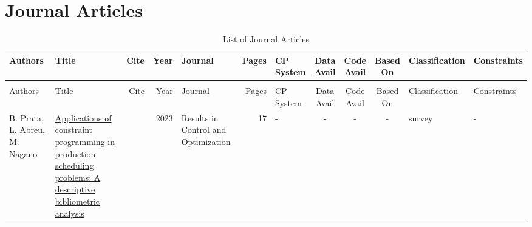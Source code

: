 \documentclass[a4paper]{article}
\begin{document}
\section{Journal Articles}

{\scriptsize
\begin{longtable}{p{3cm}p{6cm}rrp{1.5cm}rlcccp{1.5cm}l}
\caption{\label{tab:articles}List of Journal Articles}\\\toprule
Authors & Title & Cite & Year & Journal & Pages & \shortstack{CP\\System} & \shortstack{Data\\Avail} & \shortstack{Code\\Avail} & \shortstack{Based\\On} & Classification & Constraints \\  
\midrule
\endfirsthead
\caption{List of Journal Articles}\\\toprule
Authors & Title & Cite & Year & Journal & Pages & \shortstack{CP\\System} & \shortstack{Data\\Avail} & \shortstack{Code\\Avail} & \shortstack{Based\\On} & Classification & Constraints  \\  
\midrule
\endhead
\bottomrule
\endfoot
B. Prata, L. Abreu, M. Nagano& \href{articles/PrataAN23.pdf}{Applications of constraint programming in production scheduling problems: A descriptive bibliometric analysis} & \cite{PrataAN23} & 2023 & Results in Control and Optimization & 17 & -& -& -& - & survey & - \\


\end{longtable}}
\end{document}
